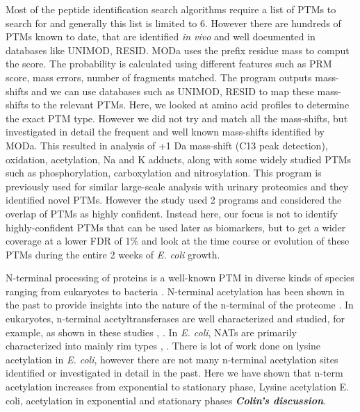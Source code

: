 \documentclass[12pt]{article}
\begin{document}
Most of the peptide identification search algorithms require a list of PTMs to search for and generally this list is limited to 6. However there are hundreds of PTMs known to date, that are identified \emph{in vivo} and well documented in databases like UNIMOD, RESID. MODa uses the prefix residue mass to comput the score. The probability is calculated using different features such as PRM score, mass errors, number of fragments matched. The program outputs mass-shifts and we can use databases such as UNIMOD, RESID to map these mass-shifts to the relevant PTMs. Here, we looked at amino acid profiles to determine the exact PTM type. However we did not try and match all the mass-shifts, but investigated in detail the frequent and well known mass-shifts identified by MODa. This resulted in analysis of +1 Da mass-shift (C13 peak detection), oxidation, acetylation, Na and K adducts, along with some widely studied PTMs such as phosphorylation, carboxylation and nitrosylation. This program is previously used for similar large-scale analysis with urinary proteomics and they identified novel PTMs. However the study used 2 programs and considered the overlap of PTMs as highly confident. Instead here, our focus is not to identify highly-confident PTMs that can be used later as biomarkers, but to get a wider coverage at a lower FDR of 1\% and look at the time course or evolution of these PTMs during the entire 2 weeks of \emph{E. coli} growth.

N-terminal processing of proteins is a well-known PTM in diverse kinds of species ranging from eukaryotes to bacteria \cite{Kimuraetal2003}. N-terminal acetylation has been shown in the past to provide insights into the nature of the n-terminal of the proteome \cite{Helbigetal2010}. In eukaryotes, n-terminal acetyltransferases are well characterized and studied, for example, as shown in these studies \cite{PolevodaSherman2003}, \cite{PolevodaSherman2003b}. In \emph{E. coli}, NATs are primarily characterized into mainly rim types \cite{Tanakaetal1989}, \cite{Yoshikawaetal1987}. There is lot of work done on lysine acetylation in \emph{E. coli}, however there are not many n-terminal acetylation sites identified or investigated in detail in the past. Here we have shown that n-term acetylation increases from exponential to stationary phase, Lysine acetylation E. coli, acetylation in exponential and stationary phases \textbf{\emph{Colin's discussion}}. 
\end{document}
